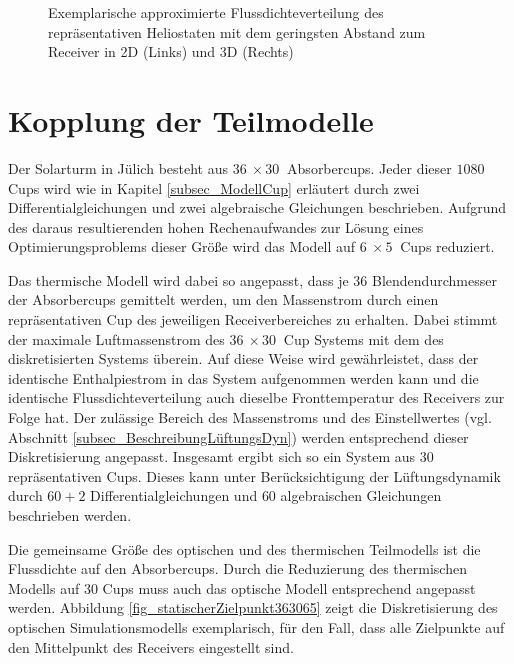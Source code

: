 \begin{figure}[h!]
{\begin{subfigure}[b]{0.48\textwidth}
            \label{fig_GaussFluxmap3D}
        \end{subfigure}
        \hfill}
    \caption[Exemplarische approximierte Flussdichteverteilung des repräsentativen Heliostaten mit dem geringsten Abstand zum Receiver in 2D und 3D]{Exemplarische approximierte Flussdichteverteilung des repräsentativen Heliostaten mit dem geringsten Abstand zum Receiver in 2D (Links) und 3D (Rechts)}
    \label{fig_GaussFluxmap}
\end{figure}

\pagebreak
\section{Kopplung der Teilmodelle} \label{sec_KopplungModelle}
Der Solarturm in Jülich besteht aus $\SI{36}{} \times \SI{30}{}$ Absorbercups.
Jeder dieser $1080$ Cups wird wie in Kapitel \ref{subsec_ModellCup} erläutert durch zwei Differentialgleichungen und zwei algebraische Gleichungen beschrieben.
Aufgrund des daraus resultierenden hohen Rechenaufwandes zur Lösung eines Optimierungsproblems dieser Größe wird das Modell auf $\SI{6}{} \times \SI{5}{}$ Cups reduziert.

Das thermische Modell wird dabei so angepasst, dass je $36$ Blendendurchmesser der Absorbercups gemittelt werden, um den Massenstrom durch einen repräsentativen Cup des jeweiligen Receiverbereiches zu erhalten.
Dabei stimmt der maximale Luftmassenstrom des $\SI{36}{} \times \SI{30}{}$ Cup Systems mit dem des diskretisierten Systems überein.
Auf diese Weise wird gewährleistet, dass der identische Enthalpiestrom in das System aufgenommen werden kann und die identische Flussdichteverteilung auch dieselbe Fronttemperatur des Receivers zur Folge hat.
Der zulässige Bereich des Massenstroms und des Einstellwertes (vgl. Abschnitt \ref{subsec_BeschreibungLüftungsDyn}) werden entsprechend dieser Diskretisierung angepasst.
Insgesamt ergibt sich so ein System aus $30$ repräsentativen Cups.
Dieses kann unter Berücksichtigung der Lüftungsdynamik durch $60+2$ Differentialgleichungen und $60$ algebraischen Gleichungen beschrieben werden.

Die gemeinsame Größe des optischen und des thermischen Teilmodells ist die Flussdichte auf den Absorbercups.
Durch die Reduzierung des thermischen Modells auf $30$ Cups muss auch das optische Modell entsprechend angepasst werden.
Abbildung \ref{fig_statischerZielpunkt363065} zeigt die Diskretisierung des optischen Simulationsmodells exemplarisch, für den Fall, dass alle Zielpunkte auf den Mittelpunkt des Receivers eingestellt sind. \pagebreak

